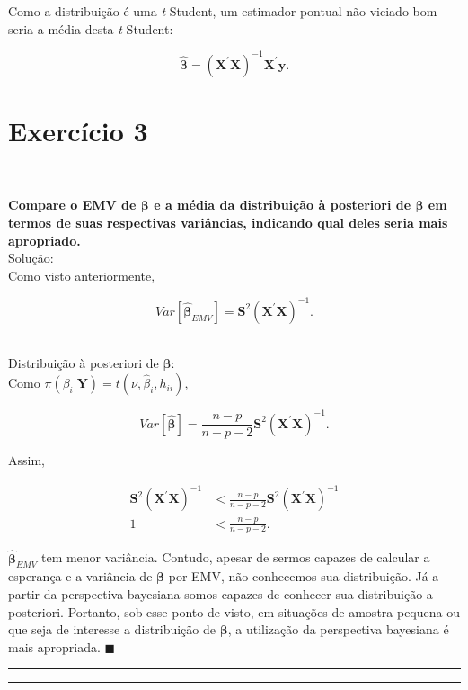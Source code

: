 \documentclass[12pt, oldfontcommands]{article}\usepackage[]{graphicx}\usepackage[]{color}
\newcommand{\horrule}[1]{\rule{\linewidth}{#1}}
\begin{document}
Como a distribuição é uma \textit{t}-Student, um estimador pontual não
viciado bom seria a média desta \textit{t}-Student:

\[
\boxed{\hat{\bm{\beta}} =
       (\mathbf{X}^{'} \mathbf{X})^{-1} \mathbf{X}^{'} \mathbf{y}.} \]

\section*{Exercício 3} 

\horrule{1pt} \\

\textbf{Compare o EMV de \(\bm{\beta}\) e a média da distribuição à
        posteriori de \(\bm{\beta}\) em termos de suas respectivas
        variâncias, indicando qual deles seria mais apropriado.} \\

\underline{Solução:} \\

Como visto anteriormente,

\begin{multicols}{2}
 \[ Var[\hat{\bm{\beta}}_{EMV}] =
    \mathbf{S}^{2} (\mathbf{X}^{'} \mathbf{X})^{-1}. \] \\

\columnbreak

Distribuição à posteriori de \(\bm{\beta}\): \\

Como \(\pi(\beta_{i}|\mathbf{Y}) = t(\nu, \hat{\beta}_{i}, h_{ii})\),

\[ Var[\hat{\bm{\beta}}] =
   \frac{n-p}{n-p-2} \mathbf{S}^{2} (\mathbf{X}^{'} \mathbf{X})^{-1}. \]
\end{multicols}

Assim,

\begin{align*}
 \mathbf{S}^{2} (\mathbf{X}^{'} \mathbf{X})^{-1} & <
 \frac{n - p}{n - p - 2} \mathbf{S}^{2} (\mathbf{X}^{'} \mathbf{X})^{-1}
 \\ 1 & < \frac{n - p}{n - p - 2}.
\end{align*}

\(\hat{\bm{\beta}}_{EMV}\) tem menor variância. Contudo, apesar de sermos
capazes de calcular a esperança e a variância de \(\bm{\beta}\) por EMV,
não conhecemos sua distribuição. Já a partir da perspectiva bayesiana
somos capazes de conhecer sua distribuição a posteriori. Portanto, sob
esse ponto de visto, em situações de amostra pequena ou que seja de
interesse a distribuição de \(\bm{\beta}\), a utilização da perspectiva
bayesiana é mais apropriada.
\hfill \(\blacksquare\)

\horrule{.5pt}

\vspace{\fill}

\horrule{1pt} \\
\end{document}
